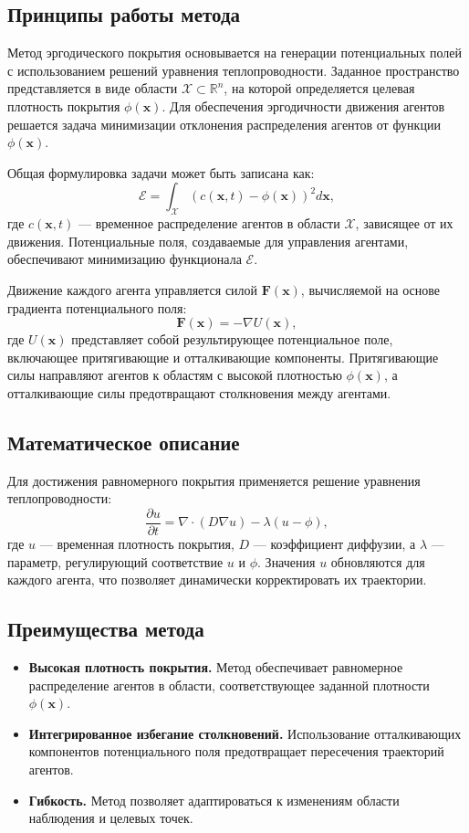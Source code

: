 \subsection{Принципы работы метода}

Метод эргодического покрытия основывается на генерации потенциальных полей с использованием решений уравнения теплопроводности. Заданное пространство представляется в виде области \( \mathcal{X} \subset \mathbb{R}^n \), на которой определяется целевая плотность покрытия \( \phi(\mathbf{x}) \). Для обеспечения эргодичности движения агентов решается задача минимизации отклонения распределения агентов от функции \( \phi(\mathbf{x}) \). 

Общая формулировка задачи может быть записана как:
\[
\mathcal{E} = \int_{\mathcal{X}} \left( c(\mathbf{x}, t) - \phi(\mathbf{x}) \right)^2 d\mathbf{x},
\]
где \( c(\mathbf{x}, t) \) — временное распределение агентов в области \( \mathcal{X} \), зависящее от их движения. Потенциальные поля, создаваемые для управления агентами, обеспечивают минимизацию функционала \( \mathcal{E} \).

Движение каждого агента управляется силой \( \mathbf{F}(\mathbf{x}) \), вычисляемой на основе градиента потенциального поля:
\[
\mathbf{F}(\mathbf{x}) = -\nabla U(\mathbf{x}),
\]
где \( U(\mathbf{x}) \) представляет собой результирующее потенциальное поле, включающее притягивающие и отталкивающие компоненты. Притягивающие силы направляют агентов к областям с высокой плотностью \( \phi(\mathbf{x}) \), а отталкивающие силы предотвращают столкновения между агентами.

\subsection{Математическое описание}

Для достижения равномерного покрытия применяется решение уравнения теплопроводности:
\[
\frac{\partial u}{\partial t} = \nabla \cdot (D \nabla u) - \lambda (u - \phi),
\]
где \( u \) — временная плотность покрытия, \( D \) — коэффициент диффузии, а \( \lambda \) — параметр, регулирующий соответствие \( u \) и \( \phi \). Значения \( u \) обновляются для каждого агента, что позволяет динамически корректировать их траектории.

\subsection{Преимущества метода}

\begin{itemize}
	\item \textbf{Высокая плотность покрытия.} Метод обеспечивает равномерное распределение агентов в области, соответствующее заданной плотности \( \phi(\mathbf{x}) \).
	\item \textbf{Интегрированное избегание столкновений.} Использование отталкивающих компонентов потенциального поля предотвращает пересечения траекторий агентов.
	\item \textbf{Гибкость.} Метод позволяет адаптироваться к изменениям области наблюдения и целевых точек.
\end{itemize}

